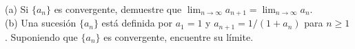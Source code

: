 \item (a) Si $\{a_n\}$ es convergente, demuestre que $\lim_{n \to \infty} a_{n+1} = \lim_{n \to \infty} a_n$. \\
    (b) Una sucesión $\{a_n\}$ está definida por $a_1 = 1$ y $a_{n+1} = 1/(1 + a_n)$ para $n \ge 1$. Suponiendo que $\{a_n\}$ es convergente, encuentre su límite.

